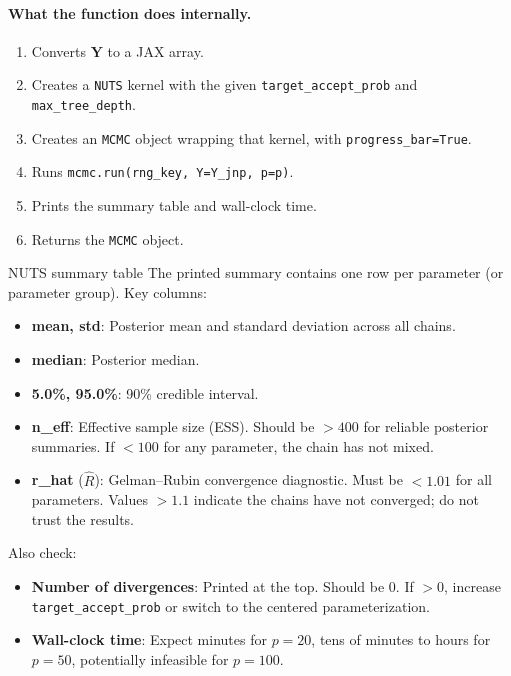 \documentclass[11pt,a4paper]{article}
\begin{document}
\paragraph{What the function does internally.}
\begin{enumerate}[nosep]
  \item Converts $\bm{Y}$ to a JAX array.
  \item Creates a \texttt{NUTS} kernel with the given \texttt{target\_accept\_prob} and \texttt{max\_tree\_depth}.
  \item Creates an \texttt{MCMC} object wrapping that kernel, with \texttt{progress\_bar=True}.
  \item Runs \texttt{mcmc.run(rng\_key, Y=Y\_jnp, p=p)}.
  \item Prints the summary table and wall-clock time.
  \item Returns the \texttt{MCMC} object.
\end{enumerate}

\begin{outputguide}{NUTS summary table}
The printed summary contains one row per parameter (or parameter group). Key columns:
\begin{itemize}[nosep]
  \item \textbf{mean, std}: Posterior mean and standard deviation across all chains.
  \item \textbf{median}: Posterior median.
  \item \textbf{5.0\%, 95.0\%}: 90\% credible interval.
  \item \textbf{n\_eff}: Effective sample size (ESS). Should be $> 400$ for reliable posterior summaries. If $< 100$ for any parameter, the chain has not mixed.
  \item \textbf{r\_hat} ($\hat{R}$): Gelman--Rubin convergence diagnostic. Must be $< 1.01$ for all parameters. Values $> 1.1$ indicate the chains have not converged; do not trust the results.
\end{itemize}
Also check:
\begin{itemize}[nosep]
  \item \textbf{Number of divergences}: Printed at the top. Should be 0. If $> 0$, increase \texttt{target\_accept\_prob} or switch to the centered parameterization.
  \item \textbf{Wall-clock time}: Expect minutes for $p=20$, tens of minutes to hours for $p=50$, potentially infeasible for $p=100$.
\end{itemize}
\end{outputguide}
\end{document}
